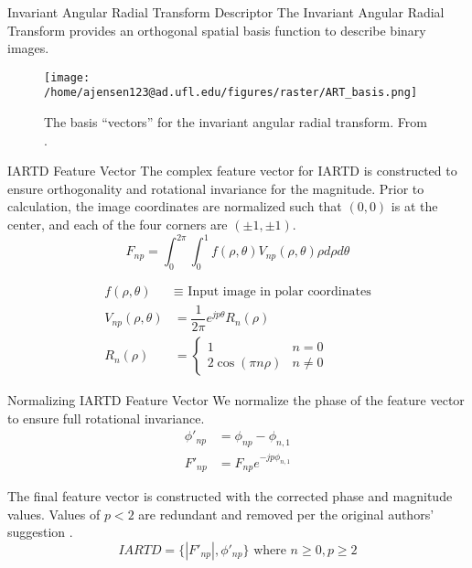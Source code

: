 \documentclass[presentation, aspectratio=1610]{beamer}
\begin{document}
\begin{frame}[label={sec:orgfafc797}]{Invariant Angular Radial Transform Descriptor}
The Invariant Angular Radial Transform provides an orthogonal spatial basis function to describe binary images.

\begin{figure}[htbp]
\centering
\texttt{[image: /home/ajensen123@ad.ufl.edu/figures/raster/ART\_basis.png]}
\caption{The basis ``vectors'' for the invariant angular radial transform. From \autocite{leeNewShapeDescription2012}.}
\end{figure}
\end{frame}
\begin{frame}[label={sec:org798d19e}]{IARTD Feature Vector}
The complex feature vector for IARTD is constructed to ensure orthogonality and rotational invariance for the magnitude. Prior to calculation, the image coordinates are normalized such that \((0,0)\) is at the center, and each of the four corners are \((\pm 1, \pm 1)\).
\begin{equation}
  F_{np} = \int_{0}^{2\pi}\int_{0}^{1} f(\rho,\theta)V_{np}(\rho,\theta)\rho d\rho d\theta
\end{equation}


\begin{equation}
	\begin{split}
		f(\rho,\theta) & \equiv \text{ Input image in polar coordinates}  \\
		V_{np}(\rho,\theta)         & = \dfrac{1}{2\pi}e^{jp\theta}R_{n}(\rho)      \\
		R_{n}(\rho)    & =
		\begin{cases}
			1                   & n=0     \\
			2 \cos (\pi n \rho) & n \ne 0
		\end{cases}
	\end{split}
\end{equation}
\end{frame}
\begin{frame}[label={sec:org23afc74}]{Normalizing IARTD Feature Vector}
We normalize the phase of the feature vector to ensure full rotational invariance.
\begin{equation}
  \begin{split}
    \phi'_{np} &= \phi_{np}-\phi_{n,1} \\
    F'_{np} &= F_{np}e^{-jp\phi_{n,1}}
  \end{split}
\end{equation}

The final feature vector is constructed with the corrected phase and magnitude values. Values of \(p<2\) are redundant and removed per the original authors' suggestion \autocite{leeNewShapeDescription2012}.
\begin{equation}
  IARTD = \{|F'_{np}|,\phi'_{np}\} \text{ where } n\ge0,p\ge2
\end{equation}
\end{frame}
\end{document}
